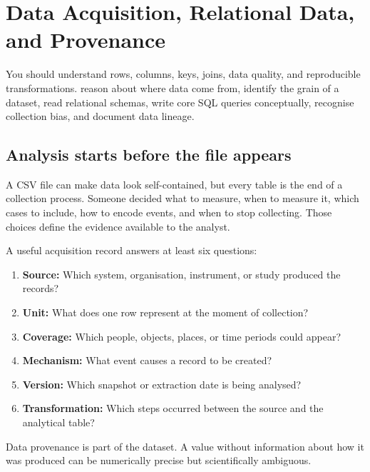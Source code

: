 \chapter{Data Acquisition, Relational Data, and Provenance}
\label{chap:acquisition}
\chapterguide
  {You should understand rows, columns, keys, joins, data quality, and reproducible transformations.}
  {reason about where data come from, identify the grain of a dataset, read relational schemas, write core SQL queries conceptually, recognise collection bias, and document data lineage.}

\section{Analysis starts before the file appears}
A CSV file can make data look self-contained, but every table is the end of a collection process. Someone decided what to measure, when to measure it, which cases to include, how to encode events, and when to stop collecting. Those choices define the evidence available to the analyst.

A useful acquisition record answers at least six questions:
\begin{enumerate}
  \item \textbf{Source:} Which system, organisation, instrument, or study produced the records?
  \item \textbf{Unit:} What does one row represent at the moment of collection?
  \item \textbf{Coverage:} Which people, objects, places, or time periods could appear?
  \item \textbf{Mechanism:} What event causes a record to be created?
  \item \textbf{Version:} Which snapshot or extraction date is being analysed?
  \item \textbf{Transformation:} Which steps occurred between the source and the analytical table?
\end{enumerate}

\begin{keyidea}
Data provenance is part of the dataset. A value without information about how it was produced can be numerically precise but scientifically ambiguous.
\end{keyidea}

